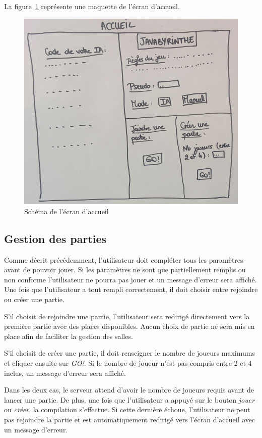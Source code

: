 	La figure~\ref{fig:ecran_accueil} représente une maquette de l'écran d'accueil.
	\begin{figure}[h]
		\centering
		\includegraphics[width=15cm]{images/schema_ecran_accueil.jpg}
		\caption{Schéma de l'écran d'accueil}
		\label{fig:ecran_accueil}
	\end{figure}

	\subsection{Gestion des parties}
		Comme décrit précédemment, l'utilisateur doit compléter tous les paramètres avant de pouvoir jouer. Si les paramètres ne sont que partiellement remplis ou non conforme l'utilisateur ne pourra pas jouer et un message d'erreur sera affiché. Une fois que l'utilisateur a tout rempli correctement, il doit choisir entre rejoindre ou créer une partie.

		S'il choisit de rejoindre une partie, l'utilisateur sera redirigé directement vers la première partie avec des places disponibles. Aucun choix de partie ne sera mis en place afin de faciliter la gestion des salles.

		S'il choisit de créer une partie, il doit renseigner le nombre de joueurs maximums et cliquer ensuite sur \textit{GO!}. Si le nombre de joueur n'est pas compris entre 2 et 4 inclus, un message d'erreur sera affiché.

		Dans les deux cas, le serveur attend d'avoir le nombre de joueurs requis avant de lancer une partie. De plus, une fois que l'utilisateur a appuyé sur le bouton \textit{jouer} ou \textit{créer}, la compilation s'effectue. Si cette dernière échoue, l'utilisateur ne peut pas rejoindre la partie et est automatiquement redirigé vers l'écran d'accueil avec un message d'erreur.


